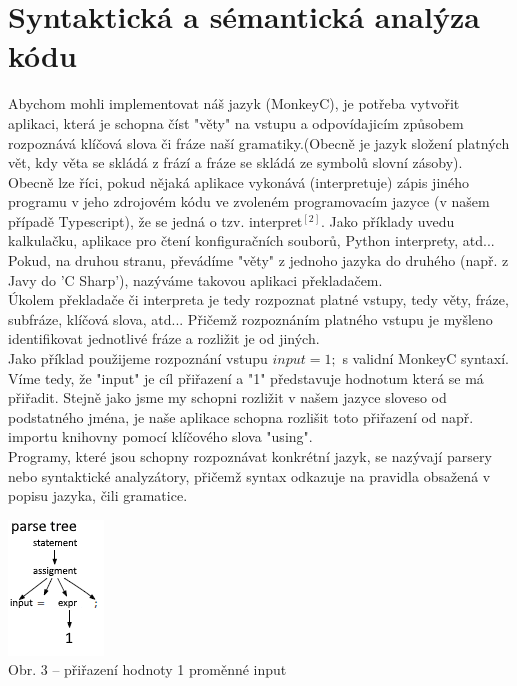 \documentclass[czech,master,dept460,male,cpp,cpdeclaration]{diploma}
\begin{document}
\section{Syntaktická a sémantická analýza kódu}

Abychom mohli implementovat náš jazyk (MonkeyC), je potřeba vytvořit aplikaci, která je schopna číst "věty" na vstupu a odpovídajicím způsobem rozpoznává klíčová slova či fráze naší gramatiky.(Obecně je jazyk složení platných vět, kdy věta se skládá z frází a fráze se skládá ze symbolů slovní zásoby).\\
Obecně lze říci, pokud nějaká aplikace vykonává (interpretuje) zápis jiného programu v jeho zdrojovém kódu ve zvoleném programovacím jazyce (v našem případě Typescript), že se jedná o tzv. interpret$^{[2]}$. Jako příklady uvedu kalkulačku, aplikace pro čtení konfiguračních souborů, Python interprety, atd... Pokud, na druhou stranu, převádíme "věty" z jednoho jazyka do druhého (např. z Javy do 'C Sharp'), nazýváme takovou aplikaci překladačem.\\
Úkolem překladače či interpreta je tedy rozpoznat platné vstupy, tedy věty, fráze, subfráze, klíčová slova, atd... Přičemž rozpoznáním platného vstupu je myšleno identifikovat jednotlivé fráze a rozližit je od jiných.\\
Jako příklad použijeme rozpoznání vstupu $input = 1;$ s validní MonkeyC syntaxí.  Víme tedy, že "input" je cíl přiřazení a "1" představuje hodnotum která se má přiřadit. Stejně jako jsme my schopni rozližit v našem jazyce sloveso od podstatného jména, je naše aplikace schopna rozlišit toto přiřazení od např. importu knihovny pomocí klíčového slova "using".\\
Programy, které jsou schopny rozpoznávat konkrétní jazyk, se nazývají parsery nebo syntaktické analyzátory, přičemž syntax odkazuje na pravidla obsažená v popisu jazyka, čili gramatice.\\

\begin{center}
	\includegraphics[scale=1.5]{assigment}
	\\
	Obr. 3 – přiřazení hodnoty 1 proměnné input
\end{center}
\end{document}
